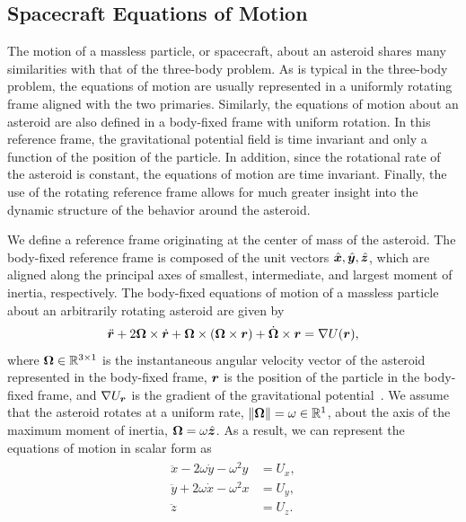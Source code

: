 \documentclass[]{aiaa-tc}%
\begin{document}
\subsection{Spacecraft Equations of Motion}\label{sec:sc_eoms}

The motion of a massless particle, or spacecraft, about an asteroid shares many similarities with that of the three-body problem.
As is typical in the three-body problem, the equations of motion are usually represented in a uniformly rotating frame aligned with the two primaries.
Similarly, the equations of motion about an asteroid are also defined in a body-fixed frame with uniform rotation.
In this reference frame, the gravitational potential field is time invariant and only a function of the position of the particle.
In addition, since the rotational rate of the asteroid is constant, the equations of motion are time invariant.
Finally, the use of the rotating reference frame allows for much greater insight into the dynamic structure of the behavior around the asteroid.

We define a reference frame originating at the center of mass of the asteroid.
The body-fixed reference frame is composed of the unit vectors \( \hat{\bm{x}} , \hat{\bm{y}}, \hat{\bm{z}} \), which are aligned along the principal axes of smallest, intermediate, and largest moment of inertia, respectively.
The body-fixed equations of motion of a massless particle about an arbitrarily rotating asteroid are given by
\begin{align}\label{eq:body_eoms}
    \ddot{\bm{r}} + 2 \bm{\Omega} \times \dot{\bm{r}} + \bm{\Omega} \times \left(  \bm{\Omega} \times \bm{r}  \right) + \dot{\bm{\Omega}} \times \bm{r} = \nabla U(\bm{r}) ,
\end{align}
where \( \bm{\Omega} \in \mathbb{R}^{3 \times 1}\) is the instantaneous angular velocity vector of the asteroid represented in the body-fixed frame, \( \bm{r} \) is the position of the particle in the body-fixed frame, and \( \nabla U_{\bm{r}} \) is the gradient of the gravitational potential~\cite{scheeres2012a}.
We assume that the asteroid rotates at a uniform rate, \( \left\| \bm{\Omega} \right\| = \omega \in \mathbb{R}^1 \), about the axis of the maximum moment of inertia, \( \bm{\Omega} = \omega \hat{\bm{z} }\).
As a result, we can represent the equations of motion in scalar form as
\begin{align} \label{eq:eoms}
    \begin{split}
        \ddot{x} - 2 \omega \dot{y} - \omega^2 y &= U_x , \\
        \ddot{y} + 2 \omega \dot{x} - \omega^2 x &= U_y , \\
        \ddot{z} &= U_z .
    \end{split}
\end{align}
\end{document}

